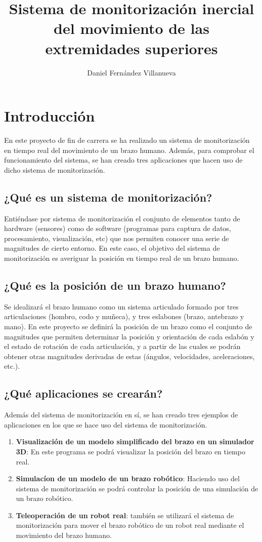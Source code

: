 \documentclass[12pt,a4paper]{article}
\author{Daniel Fernández Villanueva}
\title{Sistema de monitorización inercial del movimiento de las extremidades superiores}
\begin{document}
\section{Introducción}
En este proyecto de fin de carrera se ha realizado un sistema de monitorización en tiempo real del movimiento de un brazo humano. Además, para comprobar el funcionamiento del sistema, se han creado tres aplicaciones que hacen uso de dicho sistema de monitorización.

\subsection{¿Qué es un sistema de monitorización?}
Entiéndase por sistema de monitorización el conjunto de elementos tanto de hardware (sensores) como de software (programas para captura de datos, procesamiento, visualización, etc) que nos permiten conocer una serie de magnitudes de cierto entorno. En este caso, el objetivo del sistema de monitorización es averiguar la posición en tiempo real de un brazo humano.

\subsection{¿Qué es la posición de un brazo humano?}
Se idealizará el brazo humano como un sistema articulado formado por tres articulaciones (hombro, codo y muñeca), y tres eslabones (brazo, antebrazo y mano). En este proyecto se definirá la posición de un brazo como el conjunto de magnitudes que permiten determinar la posición y orientación de cada eslabón y el estado de rotación de cada articulación, y a partir de las cuales se podrán obtener otras magnitudes derivadas de estas (ángulos, velocidades, aceleraciones, etc.).

\subsection{¿Qué aplicaciones se crearán?}
Además del sistema de monitorización en sí, se han creado tres ejemplos de aplicaciones en los que se hace uso del sistema de monitorización.

\begin{enumerate}
\item \textbf{Visualización de un modelo simplificado del brazo en un simulador 3D}: En este programa se podrá visualizar la posición del brazo en tiempo real.

\item \textbf{Simulacíon de un modelo de un brazo robótico}: Haciendo uso del sistema de monitorización se podrá controlar la posición de una simulación de un brazo robótico.

\item \textbf{Teleoperación de un robot real}: también se utilizará el sistema de monitorización para mover el brazo robótico de un robot real mediante el movimiento del brazo humano.
\end{enumerate}
\end{document}
